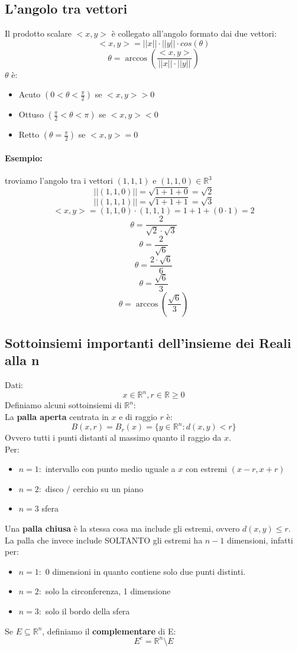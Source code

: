 \documentclass[12pt,a4paper]{article}
\begin{document}
\subsection{L'angolo tra vettori}
Il prodotto scalare $<x,y>$ è collegato all'angolo formato dai due vettori:
\[
<x,y> = ||x|| \cdot ||y|| \cdot cos(\theta)
\]
\[
\theta = \arccos(\frac{<x,y>}{||x|| \cdot ||y||})
\]
$\theta$ è:
\begin{itemize}
  \item Acuto $(0 < \theta < \frac{\pi}{2})$ se $<x,y> > 0$
  \item Ottuso $(\frac{\pi}{2} < \theta < \pi)$ se $<x,y> < 0$
  \item Retto $(\theta = \frac{\pi}{2})$ se $<x,y> = 0$
\end{itemize}
\paragraph{Esempio:} troviamo l'angolo tra i vettori $(1,1,1)$ e $(1,1,0) \in \mathbb{R}^3$
\[
||(1,1,0)|| = \sqrt{1+1+0} = \sqrt{2}
\]
\[
||(1,1,1)|| = \sqrt{1+1+1} = \sqrt{3}
\]
\[
<x,y> = (1,1,0) \cdot (1,1,1) = 1+1+(0 \cdot 1) = 2
\]
\[
\theta = \frac{2}{\sqrt{2} \cdot \sqrt{3}}
\]
\[
\theta = \frac{2}{\sqrt{6}}
\]
\[
\theta = \frac{2\cdot \sqrt{6}}{6}
\]
\[
\theta = \frac{\sqrt{6}}{3}
\]
\[
\theta = \arccos(\frac{\sqrt{6}}{3})
\]

\subsection{Sottoinsiemi importanti dell'insieme dei Reali alla n}
Dati:
\[
x \in \mathbb{R}^n, r \in \mathbb{R} \geq 0
\]
Definiamo alcuni sottoinsiemi di $\mathbb{R}^n$:\\
La \textbf{palla aperta} centrata in $x$ e di raggio $r$ è:
\[
B(x,r) = B_r(x) = \{y \in \mathbb{R}^n : d(x,y) < r\}
\] 
Ovvero tutti i punti distanti al massimo quanto il raggio da $x$.\\
Per:
\begin{itemize}
  \item $n = 1:$ intervallo con punto medio uguale a $x$ con estremi $(x-r,x+r)$
  \item $n = 2:$ disco / cerchio su un piano
  \item $n = 3$ sfera
\end{itemize}
Una \textbf{palla chiusa} è la stessa cosa ma include gli estremi, ovvero $d(x,y) \leq r$.\\
La palla che invece include SOLTANTO gli estremi ha $n-1$ dimensioni, infatti per:
\begin{itemize}
  \item $n = 1:$ 0 dimensioni in quanto contiene solo due punti distinti.
  \item $n = 2:$ solo la circonferenza, 1 dimensione
  \item $n = 3:$ solo il bordo della sfera
\end{itemize}
Se $E \subseteq \mathbb{R}^n$, definiamo il \textbf{complementare} di E:
\[
E^c = \mathbb{R}^n \setminus E
\]
\end{document}
